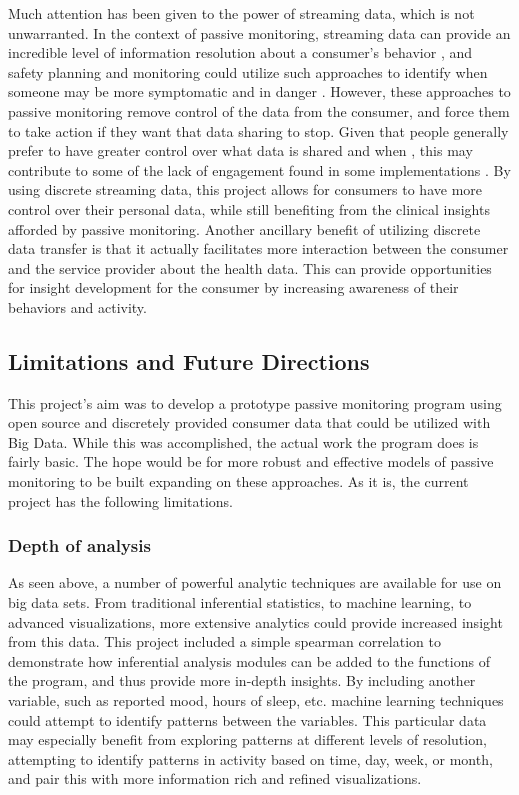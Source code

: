 \documentclass[sigconf]{acmart}
\begin{document}
Much attention has been given to the power of streaming data, which is not unwarranted. In the context of passive monitoring, streaming data can provide an incredible level of information resolution about a consumer's behavior \cite{openinfrastructure}, and safety planning and monitoring could utilize such approaches to identify when someone may be more symptomatic and in danger \cite{bitreview}. However, these approaches to passive monitoring remove control of the data from the consumer, and force them to take action if they want that data sharing to stop. Given that people generally prefer to have greater control over what data is shared and when \cite{privacypreference}, this may contribute to some of the lack of engagement found in some implementations \cite{bitreview}. By using discrete  streaming data, this project allows for consumers to have more control over their personal data, while still benefiting from the clinical insights afforded by passive monitoring. Another ancillary benefit of utilizing discrete data transfer is that it actually facilitates more interaction between the consumer and the service provider about the health data. This can provide opportunities for insight development for the consumer by increasing awareness of their behaviors and activity.

\subsection{Limitations and Future Directions}

This project's aim was to develop a prototype passive monitoring program using open source and discretely provided consumer data that could be utilized with Big Data. While this was accomplished, the actual work the program does is fairly basic. The hope would be for more robust and effective models of passive monitoring to be built expanding on these approaches. As it is, the current project has the following limitations.

\subsubsection {Depth of analysis}

As seen above, a number of powerful analytic techniques are available for use on big data sets. From traditional inferential statistics, to machine learning, to advanced visualizations, more extensive analytics could provide increased insight from this data. This project included a simple spearman correlation to demonstrate how inferential analysis modules can be added to the functions of the program, and thus provide more in-depth insights. By including another variable, such as reported mood, hours of sleep, etc. machine learning techniques could attempt to identify patterns between the variables. This particular data may especially benefit from exploring patterns at different levels of resolution, attempting to identify patterns in activity based on time, day, week, or month, and pair this with more information rich and refined visualizations. 
\end{document}
